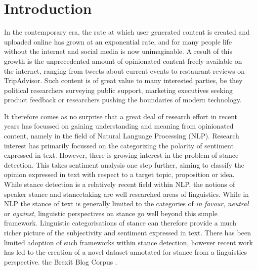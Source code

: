 \documentclass[Dissertation.tex]{subfiles}
\begin{document}
\chapter{Introduction}

In the contemporary era, the rate at which user generated content is created and uploaded online has grown at an exponential rate, and for many people life without the internet and social media is now unimaginable. A result of this growth is the unprecedented amount of opinionated content freely available on the internet, ranging from tweets about current events to restaurant reviews on TripAdvisor. Such content is of great value to many interested parties, be they political researchers surveying public support, marketing executives seeking product feedback or researchers pushing the boundaries of modern technology.

It therefore comes as no surprise that a great deal of research effort in recent years has focussed on gaining understanding and meaning from opinionated content, namely in the field of Natural Language Processing (NLP). Research interest has primarily focussed on the categorizing the polarity of sentiment expressed in text. However, there is growing interest in the problem of stance detection. This takes sentiment analysis one step further, aiming to classify the opinion expressed in text with respect to a target topic, proposition or idea. While stance detection is a relatively recent field within NLP, the notions of speaker stance and stancetaking are well researched areas of linguistics. While in NLP the stance of text is generally limited to the categories of \textit{in favour}, \textit{neutral} or \textit{against}, linguistic perspectives on stance go well beyond this simple framework. Linguistic categorisations of stance can therefore provide a much richer picture of the subjectivity and sentiment expressed in text. There has been limited adoption of such frameworks within stance detection, however recent work has led to the creation of a novel dataset annotated for stance from a linguistics perspective.  the Brexit Blog Corpus \cite{simakiAnnotatingSpeakerStance2017}.
\end{document}
